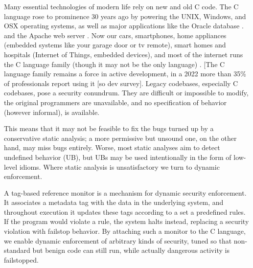\documentclass[acmsmall,review,anonymous]{acmart}\settopmatter{printfolios=true,printccs=false,printacmref=false}
\begin{document}
Many essential technologies of modern life rely on new and old C code. The C language rose to prominence 30 years ago by powering
the UNIX, Windows, and OSX operating systems,  as well as major applications like the Oracle database \cite{Munoz:PoweredbyC} . 
and the Apache web server \cite{apache97:main-site}. Now our cars, smartphones, 
home appliances (embedded systems like your garage door or tv remote), smart homes and hospitals (Internet of Things, embedded devices), 
and most of the internet runs the C language family (though it may not be the only language) \cite{Munoz:PoweredbyC}.
[The C language family remains a force in active development, in a 2022 more 
than 35\% of professionals report using it [so dev survey].
Legacy codebases, especially C codebases, pose a security conundrum. 
They are difficult or impossible to
modify, the original programmers are unavailable, and no specification of behavior (however informal), is available.


This means that it may not be feasible to fix the bugs
turned up by a conservative static analysis; a more permissive but unsound one, on the other hand,
may miss bugs entirely. Worse, most static analyses aim to detect undefined behavior (UB), but
UBs may be used intentionally in the form of low-level idioms. Where static analysis
is unsatisfactory we turn to dynamic enforcement.

A tag-based reference monitor is a mechanism for dynamic security enforcement. It associates
a metadata tag with the data in the underlying system, and throughout execution it updates these
tags according to a set a predefined rules. If the program would violate a rule, the system halts
instead, replacing a security violation with failstop behavior. By attaching such a monitor to
the C language, we enable dynamic enforcement of arbitrary kinds of security, tuned so that
non-standard but benign code can still run, while actually dangerous activity is failstopped.
\end{document}
